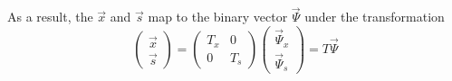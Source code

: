 \documentclass[prd,twocolumn,tightenlines,preprintnumbers,showpacs,superscriptaddress,notitlepage,nofootinbib,eqsecnum,floatfix,longbibliography,aps,10pt]{revtex4-1}
\begin{document}
As a result, the $\vec x$ and $\vec s$ map to the binary vector $\vec \Psi$ under the transformation
\begin{equation}
    \label{eq:bit-vector-mapping}
    \begin{pmatrix}
        \vec x \\ \vec s
    \end{pmatrix}
    =
    \begin{pmatrix}
        T_x & 0 \\ 0 & T_s
    \end{pmatrix}
    \begin{pmatrix}
        \vec \Psi_x \\ \vec \Psi_s
    \end{pmatrix}
    =
    T
    \vec \Psi
\end{equation}
\end{document}

